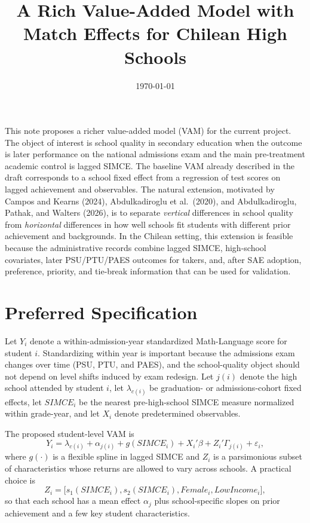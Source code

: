 \documentclass[11pt]{article}
\title{A Rich Value-Added Model with Match Effects for Chilean High Schools}
\author{}
\date{\today}
\begin{document}
\maketitle

\noindent
This note proposes a richer value-added model (VAM) for the current project. The object of interest is school quality in secondary education when the outcome is later performance on the national admissions exam and the main pre-treatment academic control is lagged SIMCE. The baseline VAM already described in the draft corresponds to a school fixed effect from a regression of test scores on lagged achievement and observables. The natural extension, motivated by Campos and Kearns (2024), Abdulkadiroglu et al.\ (2020), and Abdulkadiroglu, Pathak, and Walters (2026), is to separate \emph{vertical} differences in school quality from \emph{horizontal} differences in how well schools fit students with different prior achievement and backgrounds. In the Chilean setting, this extension is feasible because the administrative records combine lagged SIMCE, high-school covariates, later PSU/PTU/PAES outcomes for takers, and, after SAE adoption, preference, priority, and tie-break information that can be used for validation.

\section*{Preferred Specification}

Let $Y_i$ denote a within-admission-year standardized Math-Language score for student $i$. Standardizing within year is important because the admissions exam changes over time (PSU, PTU, and PAES), and the school-quality object should not depend on level shifts induced by exam redesign. Let $j(i)$ denote the high school attended by student $i$, let $\lambda_{c(i)}$ be graduation- or admissions-cohort fixed effects, let $SIMCE_i$ be the nearest pre-high-school SIMCE measure normalized within grade-year, and let $X_i$ denote predetermined observables.

The proposed student-level VAM is
\[
Y_i = \lambda_{c(i)} + \alpha_{j(i)} + g(SIMCE_i) + X_i'\beta + Z_i'\Gamma_{j(i)} + \varepsilon_i,
\]
where $g(\cdot)$ is a flexible spline in lagged SIMCE and $Z_i$ is a parsimonious subset of characteristics whose returns are allowed to vary across schools. A practical choice is
\[
Z_i = \bigl[s_1(SIMCE_i), s_2(SIMCE_i), Female_i, LowIncome_i\bigr],
\]
so that each school has a mean effect $\alpha_j$ plus school-specific slopes on prior achievement and a few key student characteristics.
\end{document}
